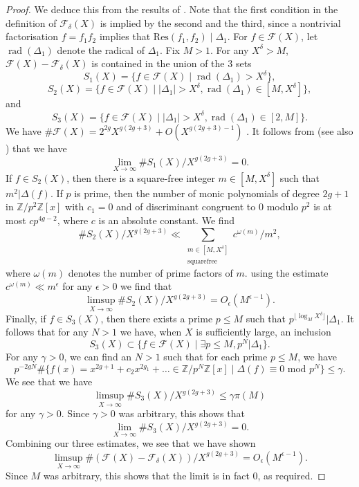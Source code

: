 \documentclass{article} %
\numberwithin{equation}{section}
\newcommand{\Z}{\mathbb{Z}}
\begin{document}
\begin{proof}
    We deduce this from the results of \cite{Bhargava-squarefree}. 
    Note that the first condition in the definition of $\mathcal{F}_{\delta}(X)$ is implied by the second and the third, since a nontrivial factorisation $f = f_1 f_2$ implies that $\mathrm{Res}(f_1, f_2) \mid \Delta_1$.
    For $f \in \mathcal{F}(X)$, let $\operatorname{rad}(\Delta_1)$ denote the radical of $\Delta_1$. Fix $M > 1$. For any $X^\delta > M$, $\mathcal{F}(X) - \mathcal{F}_\delta(X)$ is contained in the union of the 3 sets
    \[ S_1(X) = \{ f \in \mathcal{F}(X) \mid  \operatorname{rad}(\Delta_1) > X^\delta \}, \]
    \[ S_2(X) =\{ f \in \mathcal{F}(X) \mid |\Delta_1| > X^\delta, \operatorname{rad}(\Delta_1) \in [M, X^\delta] \}, \]
    and
    \[ S_3(X) = \{ f \in \mathcal{F}(X) \mid |\Delta_1| > X^\delta, \operatorname{rad}(\Delta_1) \in [2, M] \}.\]
    We have $\# \mathcal{F}(X) = 2^{2g} X^{g(2g+3)} + O(X^{g(2g+3)-1})$ \cite[Lemma 3.7]{lagathorne2024smallheightoddhyperelliptic}.
     It follows from \cite[Theorem 4.4]{Bhargava-squarefree} (see also \cite[Theorem 5.4]{Bhargava-squarefree}) that we have
    \[ \lim_{X \to \infty} \# S_1(X) / X^{g(2g+3)} = 0. \]
    If $f \in S_2(X)$, then there is a square-free integer $m \in [M, X^\delta]$ such that $m^2 | \Delta(f)$. If $p$ is prime, then the number of monic polynomials of degree $2g+1$ in $\Z / p^2 \Z[x]$ with $c_1 = 0 $ and of discriminant congruent to 0 modulo $p^2$ is at most $c p^{4g-2}$, where $c$ is an absolute constant. We find
    \[ \# S_2(X) / X^{g(2g+3)} \ll \sum_{\substack{m \in [M, X^\delta] \\ \text{squarefree}}} c^{\omega(m)} / m^2, \]
    where $\omega(m)$ denotes the number of prime factors of $m$. using the estimate $c^{\omega(m)} \ll m^\epsilon$ for any $\epsilon > 0$ we find that
    \[ \limsup_{X \to \infty} \# S_2(X) / X^{g(2g+3)}  = O_\epsilon(M^{\epsilon - 1}). \]
    Finally, if $f \in S_3(X)$, then there exists a prime $p \leq M$ such that $p^{\lfloor \log_M X^\delta \rfloor} | \Delta_1$. It follows that for any $N > 1$ we have, when $X$ is sufficiently large, an inclusion
    \[ S_3(X) \subset \{ f \in \mathcal{F}(X) \mid \exists p \leq M,  p^N | \Delta_1 \}. \]
    For any $\gamma > 0 $, we can find an $N > 1$ such that for each prime $p \leq M$, we have
    \[ p^{-2g N} \# \{ f(x) = x^{2g+1} + c_2 x^{2g_1} + \dots \in \Z / p^N \Z[x] \mid \Delta(f) \equiv 0 \text{ mod }p^N \} \leq \gamma. \]
    We see that we have
    \[ \limsup_{X \to \infty} \# S_3(X) / X^{g(2g+3)} \leq \gamma \pi(M) \]
    for any $\gamma > 0$. Since $\gamma > 0$ was arbitrary, this shows that
    \[ \lim_{X \to \infty} \# S_3(X) / X^{g(2g+3)} = 0. \]
    Combining our three estimates, we see that we have shown
    \[ \limsup_{X \to \infty} \# ( \mathcal{F}(X) - \mathcal{F}_\delta(X) ) / X^{g(2g+3)} = O_\epsilon(M^{\epsilon - 1}). \]
    Since $M$ was arbitrary, this shows that the limit is in fact 0, as required. 
\end{proof}
\end{document}
